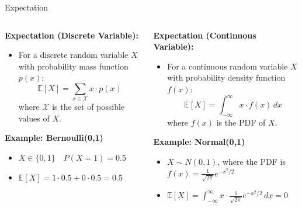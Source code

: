 \documentclass[xcolor=svgnames,t]{beamer}
\begin{document}
\begin{frame}{Expectation }
    \begin{columns}
        \begin{column}{0.45\textwidth}
            \textbf{Expectation (Discrete Variable):}
            \begin{itemize}
                \item For a discrete random variable \( X \) with probability mass function \( p(x) \):
                \[
                \mathbb{E}[X] = \sum_{x \in \mathcal{X}} x \cdot p(x)
                \]
                where \( \mathcal{X} \) is the set of possible values of \( X \).
            \end{itemize}
            \pause
            \vspace{0.3cm}
            
            \textbf{Example: Bernoulli(0,1)}
            \begin{itemize}
                \item \( X \in \{0,1\} \quad P(X = 1) = 0.5 \) 
                \item \( \mathbb{E}[X] = 1 \cdot 0.5 + 0 \cdot 0.5 = 0.5 \)
            \end{itemize}
        \end{column}
        
        \pause
        
        \begin{column}{0.45\textwidth}
            \textbf{Expectation (Continuous Variable):}
            \begin{itemize}
                \item For a continuous random variable \( X \) with probability density function \( f(x) \):
                \[
                \mathbb{E}[X] = \int_{-\infty}^{\infty} x \cdot f(x) \, dx
                \]
                where \( f(x) \) is the PDF of \( X \).
            \end{itemize}
            
            \pause
            
            \vspace{0.3cm}
            
            \textbf{Example: Normal(0,1)}
            \begin{itemize}
                \item \( X \sim N(0, 1) \), where the PDF is \( f(x) = \frac{1}{\sqrt{2\pi}} e^{-x^2/2} \)
                \item \( \mathbb{E}[X] = \int_{-\infty}^{\infty} x \cdot \frac{1}{\sqrt{2\pi}} e^{-x^2/2} \, dx = 0 \)
            \end{itemize}
        \end{column}
    \end{columns}
\end{frame}
\end{document}
